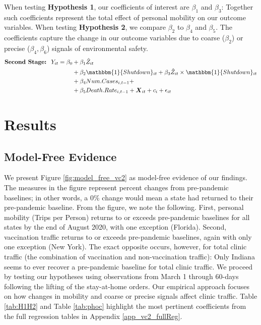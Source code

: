  When testing \textbf{Hypothesis 1}, our coefficients of interest are $\beta_1$ and $\beta_3$: Together such coefficients represent the total effect of personal mobility on our outcome variables. When testing \textbf{Hypothesis 2}, we compare $\beta_2$ to $\beta_4$ and $\beta_5$. The coefficients capture the change in our outcome variables due to coarse ($\beta_2$) or precise ($\beta_4,\beta_6$) signals of environmental safety. 
 \begin{equation} \begin{split} \label{spec_2sls}
     \textbf{Second Stage: \:}  Y_{it} = \beta_0 & + \beta_1 \hat{Z}_{it} \\ & + \beta_2 \mathbbm{1}\{Shutdown\}_{it} + \beta_3 \hat{Z}_{it} \times \mathbbm{1}\{Shutdown\}_{it} \\ & + \beta_4 Num.Cases_{i,t-1} + \\ & + \beta_5 Death.Rate_{i,t-1} + \boldsymbol{X}_{it} + c_i + \epsilon_{it} 
 \end{split} \end{equation}
 
 
\section{Results} \label{VC2_Results}
 \subsection{Model-Free Evidence}
 We present Figure \ref{fig:model_free_vc2} as model-free evidence of our findings. The measures in the figure represent percent changes from pre-pandemic baselines; in other words, a 0\% change would mean a state had returned to their pre-pandemic baseline. From the figure, we note the following. First, personal mobility (Trips per Person) returns to or exceeds pre-pandemic baselines for all states by the end of August 2020, with one exception (Florida). Second, vaccination traffic returns to or exceeds pre-pandemic baselines, again with only one exception (New York). The exact opposite occurs, however, for total clinic traffic (the combination of vaccination and non-vaccination traffic): Only Indiana seems to ever recover a pre-pandemic baseline for total clinic traffic. We proceed by testing our hypotheses using observations from March 1 through 60-days following the lifting of the stay-at-home orders. Our empirical approach focuses on how changes in mobility and coarse or precise signals affect clinic traffic. Table \ref{tab:H1H2} and Table \ref{tab:phoc} highlight the most pertinent coefficients from the full regression tables in Appendix \ref{app_vc2_fullReg}.
 
